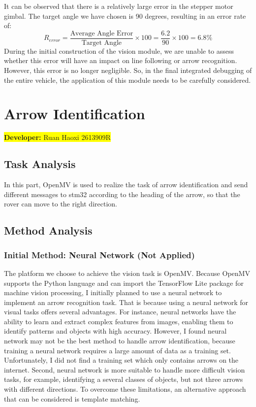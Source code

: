 \documentclass[12pt, a4paper, oneside]{report}
\begin{document}
It can be observed that there is a relatively large error in the stepper motor gimbal. The target angle we have chosen is 90 degrees, resulting in an error rate of: 
$$R_{error}=\frac{\text{Average Angle Error}}{\text{Target Angle}}\times 100=\frac{6.2}{90}\times 100=6.8\text{\%}$$
During the initial construction of the vision module, we are unable to assess whether this error will have an impact on line following or arrow recognition. However, this error is no longer negligible. So, in the final integrated debugging of the entire vehicle, the application of this module needs to be carefully considered.

\newpage
\section{Arrow Identification}\label{sec:Arrow}
\colorbox{yellow}{\textbf{Developer:} Ruan Haoxi 2613909R}

\subsection{Task Analysis}
In this part, OpenMV is used to realize the task of arrow identification and send different messages to stm32 according to the heading of the arrow, so that the rover can move to the right direction.
\subsection{Method Analysis}
\subsubsection{Initial Method: Neural Network (Not Applied)}
The platform we choose to achieve the vision task is OpenMV. Because OpenMV supports the Python language and can import the TensorFlow Lite package for machine vision processing, I initially planned to use a neural network to implement an arrow recognition task. That is because using a neural network for visual tasks offers several advantages. For instance, neural networks have the ability to learn and extract complex features from images, enabling them to identify patterns and objects with high accuracy. However, I found neural network may not be the best method to handle arrow identification, because training a neural network requires a large amount of data as a training set. Unfortunately, I did not find a training set which only contains arrows on the internet. Second, neural network is more suitable to handle more difficult vision tasks, for example, identifying a several classes of objects, but not three arrows with different directions. To overcome these limitations, an alternative approach that can be considered is template matching. 
\end{document}
